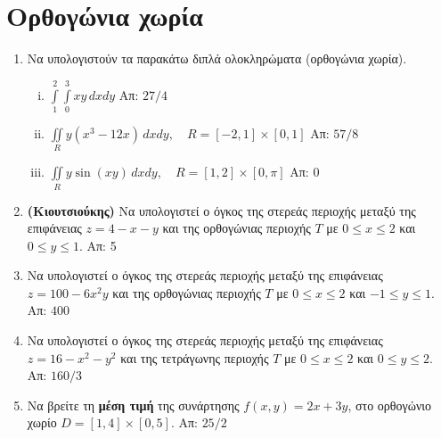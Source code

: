 



\geometry{top=2cm}
\pagestyle{askhseis}
\everymath{\displaystyle}




\begin{center}
  \minibox{\large\bf \textcolor{Col1}{Ασκήσεις Διπλό Ολοκλήρωμα}}
\end{center}


\section*{Ορθογώνια χωρία}

\begin{enumerate}
  \item Να υπολογιστούν τα παρακάτω διπλά ολοκληρώματα (ορθογώνια χωρία).
    \begin{enumerate}[i)]
      \item $\int\limits_1^2\!\!\!\int\limits_0^ 3xy\,dxdy$ 
        \hfill Απ: ${27}/{4}$ %
      \item $\iint\limits_{R}y(x^3-12x)\,dxdy,\quad R=[-2,1]\times[0,1]$ 
        \hfill Απ: ${57}/{8}$
      \item $ \iint\limits_{R}y\sin(xy)\,dxdy, \quad R=[1,2]\times[0,\pi] $ 
        \hfill Απ: $ 0 $ 
    \end{enumerate}

  \item \textbf{(Κιουτσιούκης)} Να υπολογιστεί ο όγκος της στερεάς περιοχής μεταξύ 
    της επιφάνειας $ z=4-x-y $ και της ορθογώνιας περιοχής $T$ με $ 0 \leq x \leq 2 $ 
    και $ 0 \leq y \leq 1 $. \hfill Απ: 5  

  \item Να υπολογιστεί ο όγκος της στερεάς περιοχής μεταξύ της επιφάνειας 
    $ z = 100 - 6x^{2}y $ και της ορθογώνιας περιοχής $T$ με 
    $ 0 \leq x \leq 2 $ και $ -1 \leq y \leq 1 $. \hfill Απ: $400$ 

  \item Να υπολογιστεί ο όγκος της στερεάς περιοχής μεταξύ της 
    επιφάνειας $ z= 16-x^{2}-y^{2} $ και της τετράγωνης περιοχής $T$ με 
    $ 0 \leq x \leq 2 $ και $ 0 \leq y \leq 2 $. \hfill Απ: $160/3$ 

  \item Να βρείτε τη \textbf{μέση τιμή} της συνάρτησης $ f(x,y)=2x+3y $, στο 
    ορθογώνιο χωρίο $D= [1,4] \times [0,5]$.
    \hfill Απ: $ {25}/{2} $ 


\end{enumerate}
